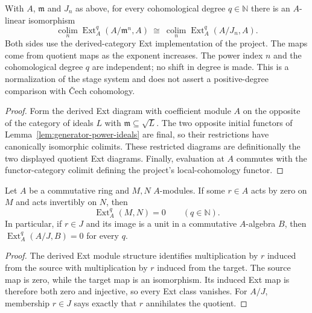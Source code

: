 \begin{theorem}\label{thm:generator-power-ext-colimit}
With $A$, $\mathfrak m$ and $J_n$ as above, for every cohomological degree
$q\in\mathbb N$ there is an $A$-linear isomorphism
\[
 \operatorname*{colim}_{n}\operatorname{Ext}^q_A(A/\mathfrak m^n,A)
 \ \cong\
 \operatorname*{colim}_{n}\operatorname{Ext}^q_A(A/J_n,A).
\]
Both sides use the derived-category Ext implementation of the project.
The maps come from quotient maps as the exponent increases. The power
index $n$ and the cohomological degree $q$ are independent; no shift
in degree is made. This is a normalization of the stage system and
does not assert a positive-degree comparison with Čech cohomology.
\leanok
\end{theorem}
\begin{proof}
Form the derived Ext diagram with coefficient module $A$ on the opposite
of the category of ideals $L$ with $\mathfrak m\subseteq\sqrt L$.
The two opposite initial functors of
Lemma~\ref{lem:generator-power-ideals} are final, so their restrictions
have canonically isomorphic colimits. These restricted diagrams are
definitionally the two displayed quotient Ext diagrams. Finally,
evaluation at $A$ commutes with the functor-category colimit defining
the project's local-cohomology functor.
\end{proof}

\begin{lemma}[Derived Ext vanishing from a scalar]\label{lem:localized-ext-scalar}
Let $A$ be a commutative ring and $M,N$ $A$-modules. If some $r\in A$
acts by zero on $M$ and acts invertibly on $N$, then
\[
  \operatorname{Ext}^q_A(M,N)=0\qquad(q\in\mathbb N).
\]
In particular, if $r\in J$ and its image is a unit in a commutative
$A$-algebra $B$, then $\operatorname{Ext}^q_A(A/J,B)=0$ for every $q$.
\leanok
\end{lemma}
\begin{proof}
The derived Ext module structure identifies multiplication by $r$ induced
from the source with multiplication by $r$ induced from the target. The
source map is zero, while the target map is an isomorphism. Its induced Ext
map is therefore both zero and injective, so every Ext class vanishes. For
$A/J$, membership $r\in J$ says exactly that $r$ annihilates the quotient.
\end{proof}

